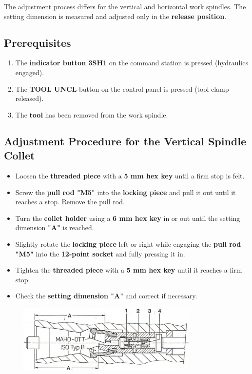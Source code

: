 
The adjustment process differs for the vertical and horizontal work spindles.  
The setting dimension is measured and adjusted only in the \textbf{release position}.

\subsection*{Prerequisites}

\begin{enumerate}
    \item The \textbf{indicator button {3SH1}} on the command station is pressed (hydraulics engaged).\footnotemark[1]
    \item The \textbf{TOOL UNCL} button on the control panel is pressed (tool clamp released).\footnotemark[1]
    \item The \textbf{tool} has been removed from the work spindle.
\end{enumerate}

\subsection*{Adjustment Procedure for the Vertical Spindle Collet}

\begin{itemize}
    \item Loosen the \textbf{threaded piece } with a \textbf{5 mm hex key} until a firm stop is felt.
    \item Screw the \textbf{pull rod "M5"} into the \textbf{locking piece } and pull it out until it reaches a stop. Remove the pull rod.
    \item Turn the \textbf{collet holder } using a \textbf{6 mm hex key} in or out until the setting dimension \textbf{"A"} is reached.
    \item Slightly rotate the \textbf{locking piece } left or right while engaging the \textbf{pull rod "M5"} into the \textbf{12-point socket } and fully pressing it in.
    \item Tighten the \textbf{threaded piece } with a \textbf{5 mm hex key} until it reaches a firm stop.
    \item Check the \textbf{setting dimension "A"} and correct if necessary.
\end{itemize}

\begin{figure}[H]
    \centering
    \includegraphics[width=0.8\textwidth]{images/chapter7/collet_adjustment.jpg}
    \label{fig:collet_adjustment}
\end{figure}


